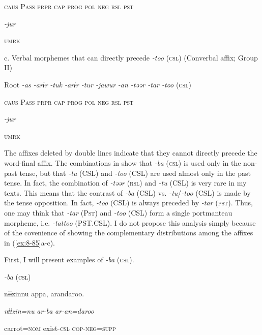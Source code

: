     \textsc{caus}  P\textsc{ass}  \textsc{prpr}  \textsc{cap}  \textsc{prog}  \textsc{pol}  \textsc{neg}  \textsc{rsl}  \textsc{pst}

          \textit{{}-jur} 

          \textsc{umrk}

  c. Verbal morphemes that can directly precede \textit{{}-too} (\textsc{csl}) (Converbal affix; Group II)

  Root  \textit{{}-as  {}-arɨr} %
\textit{{}-tuk  {}-arɨr  {}-tur  {}-jawur} %
\textit{{}-an  {}-təər  {}-tar  {}-too} (\textsc{csl})

    \textsc{caus}  P\textsc{ass}  \textsc{prpr}  \textsc{cap}  \textsc{prog}  \textsc{pol}  \textsc{neg}  \textsc{rsl}  \textsc{pst}

          \textit{{}-jur} 

          \textsc{umrk}

The affixes deleted by double lines indicate that they cannot directly precede the word-final affix. The combinations in  show that \textit{{}-ba} (\textsc{csl}) is used only in the non-past tense, but that \textit{{}-tu} (CSL) and \textit{{}-too} (CSL) are used almost only in the past tense. In fact, the combination of \textit{{}-təər} (\textsc{rsl}) and \textit{{}-tu} (CSL) is very rare in my texts. This means that the contrast of \textit{{}-ba} (CSL) vs. \textit{{}-tu}/\textit{{}-too} (CSL) is made by the tense opposition. In fact, \textit{-too} (CSL) is always preceded by \textit{{}-tar} (\textsc{pst}). Thus, one may think that \textit{{}-tar} (P\textsc{st}) and \textit{{}-too} (CSL) form a single portmanteau morpheme, i.e. \textit{{}-tattoo} (PST.CSL). I do not propose this analysis simply because of the covenience of showing the complementary distributions among the affixes in (\ref{ex:8-85}a-c).

  First, I will present examples of \textit{{}-ba} (\textsc{csl}).

\ea\label{ex:8-86}
  \textit{{}-ba} (\textsc{csl})


    {\TM}
\glll  nɨɨzinnu  appa,  arandaroo.

      \textit{nɨɨzin=nu}  \textit{ar-ba}  \textit{ar-an=daroo}

      carrot=\textsc{nom}  exist-\textsc{csl}  \textsc{cop}-\textsc{neg}=\textsc{supp}

